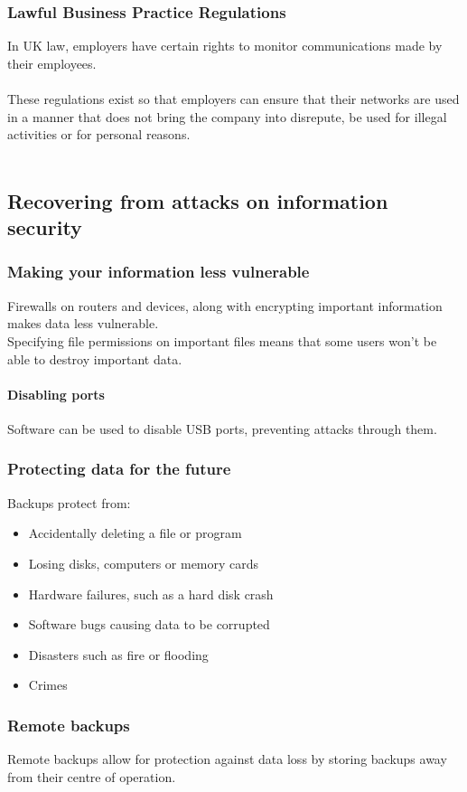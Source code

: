 \documentclass{article}[18pt]
\begin{document}
\subsubsection{Lawful Business Practice Regulations}
In UK law, employers have certain rights to monitor communications made by their employees.\\
\\
These regulations exist so that employers can ensure that their networks are used in a manner that does not bring the company into disrepute, be used for illegal activities or for personal reasons.\\
\\
\subsection{Recovering from attacks on information security}
\subsubsection{Making your information less vulnerable}
Firewalls on routers and devices, along with encrypting important information makes data less vulnerable.\\
Specifying file permissions on important files means that some users won't be able to destroy important data.
\paragraph{Disabling ports}
Software can be used to disable USB ports, preventing attacks through them.
\subsubsection{Protecting data for the future}
Backups protect from:
\begin{itemize}
\item Accidentally deleting a file or program
\item Losing disks, computers or memory cards
\item Hardware failures, such as a hard disk crash
\item Software bugs causing data to be corrupted
\item Disasters such as fire or flooding
\item Crimes
\end{itemize}
\subsubsection{Remote backups}
Remote backups allow for protection against data loss by storing backups away from their centre of operation.
\end{document}
